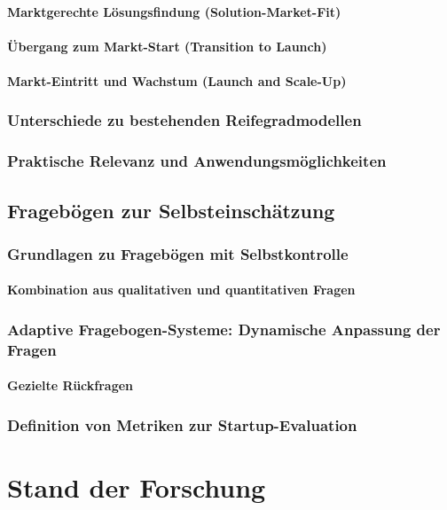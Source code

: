 \subsubsection{Marktgerechte Lösungsfindung (Solution-Market-Fit)}
\subsubsection{Übergang zum Markt-Start (Transition to Launch)}
\subsubsection{Markt-Eintritt und Wachstum (Launch and Scale-Up)}
\subsection{Unterschiede zu bestehenden Reifegradmodellen}
\subsection{Praktische Relevanz und Anwendungsmöglichkeiten}


\section{Fragebögen zur Selbsteinschätzung}
\subsection{Grundlagen zu Fragebögen mit Selbstkontrolle}
\subsubsection{Kombination aus qualitativen und quantitativen Fragen}
\subsection{Adaptive Fragebogen-Systeme: Dynamische Anpassung der Fragen}
\subsubsection{Gezielte Rückfragen}
\subsection{Definition von Metriken zur Startup-Evaluation}

\chapter{Stand der Forschung}

